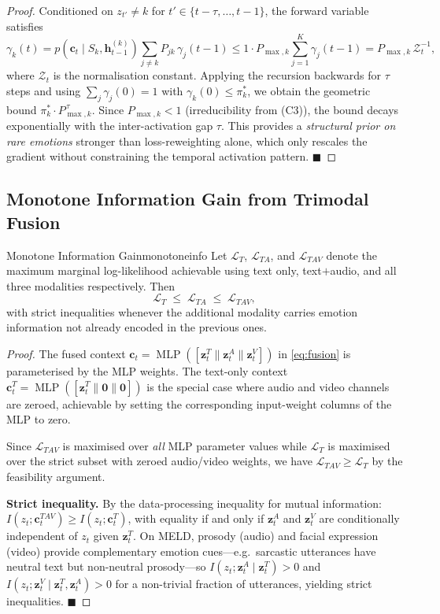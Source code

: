 \documentclass[11pt, a4paper]{article}
\DeclareMathOperator{\MLP}{MLP}
\newcommand{\cL}{\mathcal{L}}
\newcommand{\bh}{\mathbf{h}}
\newcommand{\bc}{\mathbf{c}}
\newcommand{\bz}{\mathbf{z}}
\newcommand{\pistar}{\pi^{*}}
\newcommand{\QED}{\hfill$\blacksquare$}
\begin{document}
\begin{proof}
Conditioned on $z_{t'}\ne k$ for $t'\in\{t-\tau,\ldots,t-1\}$, the forward
variable satisfies
\[
  \gamma_k(t)
  = p(\bc_t\mid S_k,\bh_{t-1}^{(k)})
    \sum_{j\ne k} P_{jk}\,\gamma_j(t-1)
  \le 1\cdot P_{\max,k}\sum_{j=1}^K\gamma_j(t-1)
  = P_{\max,k}\,\mathcal{Z}_t^{-1},
\]
where $\mathcal{Z}_t$ is the normalisation constant.
Applying the recursion backwards for $\tau$ steps and using
$\sum_j\gamma_j(0)=1$ with $\gamma_k(0)\le\pistar_k$, we obtain the
geometric bound $\pistar_k\cdot P_{\max,k}^{\,\tau}$.
Since $P_{\max,k}<1$ (irreducibility from (C3)), the bound decays
exponentially with the inter-activation gap $\tau$.
This provides a \emph{structural prior on rare emotions} stronger than
loss-reweighting alone, which only rescales the gradient without constraining
the temporal activation pattern.  \QED
\end{proof}

\subsection{Monotone Information Gain from Trimodal Fusion}

\begin{theorem}{Monotone Information Gain}{monotoneinfo}
Let $\cL_T$, $\cL_{TA}$, and $\cL_{TAV}$ denote the maximum marginal
log-likelihood achievable using text only, text$+$audio, and all three
modalities respectively.  Then
\[
  \cL_T \;\le\; \cL_{TA} \;\le\; \cL_{TAV},
\]
with strict inequalities whenever the additional modality carries emotion
information not already encoded in the previous ones.
\end{theorem}

\begin{proof}
The fused context $\bc_t=\MLP([\bz_t^T\|\bz_t^A\|\bz_t^V])$ in
\cref{eq:fusion} is parameterised by the MLP weights.  The text-only context
$\bc_t^T=\MLP([\bz_t^T\|\mathbf{0}\|\mathbf{0}])$ is the special case where
audio and video channels are zeroed, achievable by setting the corresponding
input-weight columns of the MLP to zero.

Since $\cL_{TAV}$ is maximised over \emph{all} MLP parameter values while
$\cL_T$ is maximised over the strict subset with zeroed audio/video weights,
we have $\cL_{TAV}\ge\cL_T$ by the feasibility argument.

\medskip\noindent
\textbf{Strict inequality.}\;
By the data-processing inequality for mutual information:
$I(z_t;\bc_t^{TAV})\ge I(z_t;\bc_t^T)$, with equality if and only if
$\bz_t^A$ and $\bz_t^V$ are conditionally independent of $z_t$ given
$\bz_t^T$.  On MELD, prosody (audio) and facial expression (video) provide
complementary emotion cues---e.g.\ sarcastic utterances have neutral
text but non-neutral prosody---so
$I(z_t;\bz_t^A\mid\bz_t^T)>0$ and
$I(z_t;\bz_t^V\mid\bz_t^T,\bz_t^A)>0$
for a non-trivial fraction of utterances, yielding strict inequalities.  \QED
\end{proof}
\end{document}
